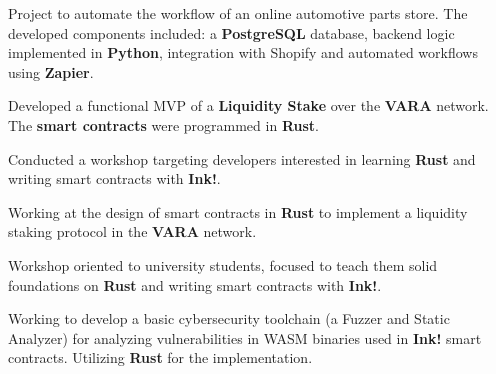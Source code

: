 


\sepspace




{Project to automate the workflow of an online automotive parts store. The developed
components included: a \textbf{PostgreSQL} database, backend logic implemented in
\textbf{Python}, integration with Shopify and automated workflows using \textbf{Zapier}.}

{Developed a functional MVP of a \textbf{Liquidity Stake} over the \textbf{VARA}
network. The \textbf{smart contracts} were programmed in \textbf{Rust}.}

{Conducted a workshop targeting developers interested in learning \textbf{Rust}
and writing smart contracts with \textbf{Ink!}.}

{Working at the design of smart contracts in \textbf{Rust} to implement a
liquidity staking protocol in the \textbf{VARA} network. }

{Workshop oriented to university students, focused to teach them solid foundations
on \textbf{Rust} and writing smart contracts with \textbf{Ink!}.}

{Working to develop a basic cybersecurity toolchain (a Fuzzer and Static
Analyzer) for analyzing vulnerabilities in WASM binaries used in \textbf{Ink!}
smart contracts. Utilizing \textbf{Rust} for the implementation.}

